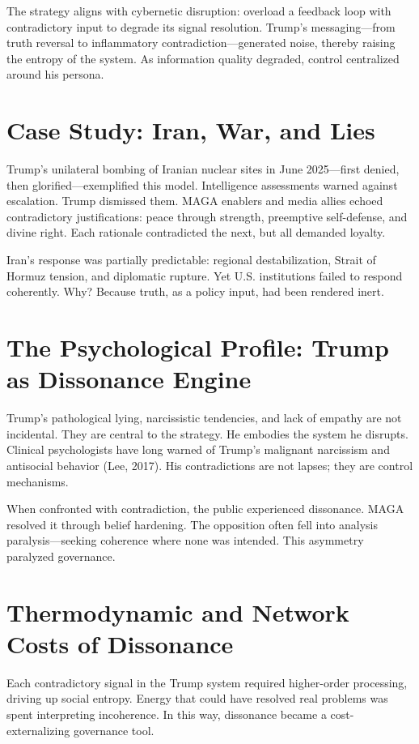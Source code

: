 \documentclass[
]{article}
\begin{document}
The strategy aligns with cybernetic disruption: overload a feedback loop with contradictory input to degrade its signal resolution. Trump's messaging---from truth reversal to inflammatory contradiction---generated noise, thereby raising the entropy of the system. As information quality degraded, control centralized around his persona.

\section*{Case Study: Iran, War, and Lies}

Trump's unilateral bombing of Iranian nuclear sites in June 2025---first denied, then glorified---exemplified this model. Intelligence assessments warned against escalation. Trump dismissed them. MAGA enablers and media allies echoed contradictory justifications: peace through strength, preemptive self-defense, and divine right. Each rationale contradicted the next, but all demanded loyalty.

Iran's response was partially predictable: regional destabilization, Strait of Hormuz tension, and diplomatic rupture. Yet U.S. institutions failed to respond coherently. Why? Because truth, as a policy input, had been rendered inert.

\section*{The Psychological Profile: Trump as Dissonance Engine}

Trump's pathological lying, narcissistic tendencies, and lack of empathy are not incidental. They are central to the strategy. He embodies the system he disrupts. Clinical psychologists have long warned of Trump's malignant narcissism and antisocial behavior (Lee, 2017). His contradictions are not lapses; they are control mechanisms.

When confronted with contradiction, the public experienced dissonance. MAGA resolved it through belief hardening. The opposition often fell into analysis paralysis---seeking coherence where none was intended. This asymmetry paralyzed governance.

\section*{Thermodynamic and Network Costs of Dissonance}

Each contradictory signal in the Trump system required higher-order processing, driving up social entropy. Energy that could have resolved real problems was spent interpreting incoherence. In this way, dissonance became a cost-externalizing governance tool.
\end{document}
